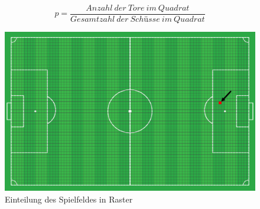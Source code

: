 \begin{equation}
p = \frac{Anzahl~der~Tore~im~Quadrat}{Gesamtzahl~der~Schüsse~im~Quadrat}
\end{equation}

\begin{figure}[H]
\centering
\includegraphics[scale=0.28]{se-wa-jpg/raster}
\caption[Einteilung des Spielfeldes in Raster]{Einteilung des Spielfeldes in Raster}
\label{transf_pitch}
\end{figure}

